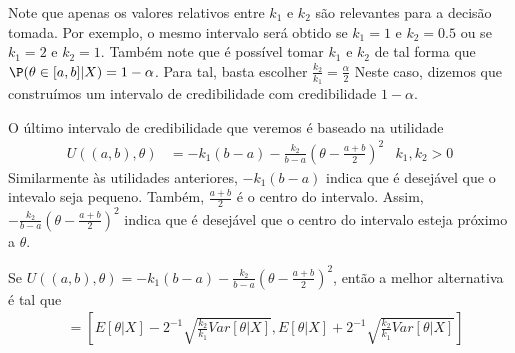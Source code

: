 Note que apenas os valores relativos entre
$k_1$ e $k_2$ são relevantes para a decisão tomada.
Por exemplo, o mesmo intervalo será obtido se 
$k_1=1$ e $k_2=0.5$ ou se $k_1=2$ e $k_2=1$.
Também note que é possível tomar $k_1$ e $k_2$ 
de tal forma que $\P(\theta \in [a,b]|X) = 1-\alpha$.
Para tal, basta escolher 
$\frac{k_2}{k_1} = \frac{\alpha}{2}$ 
Neste caso, dizemos que construímos um intervalo de credibilidade com credibilidade $1-\alpha$.

O último intervalo de credibilidade que 
veremos é baseado na utilidade
\begin{align*}
U((a,b),\theta)
&= -k_{1}(b-a)
-\frac{k_{2}}{b-a}\left(\theta -\frac{a+b}{2}\right)^{2}
& k_{1},k_{2} > 0
\end{align*}
Similarmente às utilidades anteriores,
$-k_{1}(b-a)$ indica que 
é desejável que o intevalo seja pequeno.
Também, $\frac{a+b}{2}$ é o centro do intervalo.
Assim, $-\frac{k_{2}}{b-a}\left(\theta - \frac{a+b}{2}\right)^{2}$ indica que 
é desejável que o centro do intervalo esteja
próximo a $\theta$.
\begin{theorem}
\label{thm:credible_interval_3}
Se $U((a,b),\theta) = -k_{1}(b-a) -\frac{k_{2}}{b-a}\left(\theta - \frac{a+b}{2}\right)^{2}$,
então a melhor alternativa é tal que
\begin{align*}
[a,b]	&= \left[E[\theta|X]-2^{-1}\sqrt{\frac{k_2}{k_1}Var[\theta|X]}, E[\theta|X]+2^{-1}\sqrt{\frac{k_2}{k_1}Var[\theta|X]}\right]
\end{align*}
\end{theorem}
